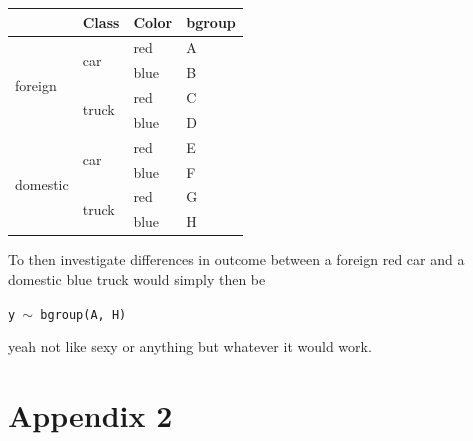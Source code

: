 \documentclass{article}
\begin{document}
\begin{center}

\begin{tabular}{|p{0.9in}|p{0.9in}|p{0.9in}|p{0.5in}|} \hline 
\rowcolor{lightgray} \multicolumn{1}{|c|}{Origin} & \multicolumn{1}{c|}{Class} & \multicolumn{1}{c|}{Color} & \multicolumn{1}{c|}{bgroup}\\
\hline
\multirow{4}{*}{foreign} & \multirow{2}{*}{car} & red & A\\
\hhline{~~--}
& & blue & B \\
\hhline{~---}
& \multirow{2}{*}{truck} & red & C\\
\hhline{~~--}
& & blue & D\\
\hline
\multirow{4}{*}{domestic} & \multirow{2}{*}{car} & red & E \\
\hhline{~~--}
& & blue & F\\
\hhline{~---}
& \multirow{2}{*}{truck} & red & G\\
\hhline{~~--}
& & blue & H\\
\hline
\end{tabular}
\end{center}

To then investigate differences in outcome between a foreign red car and a domestic blue truck would simply then be

\begin{center}
\tt y $\sim$ bgroup(A, H)
\end{center}

yeah not like sexy or anything but whatever it would work.


\section{Appendix 2}
\end{document}
